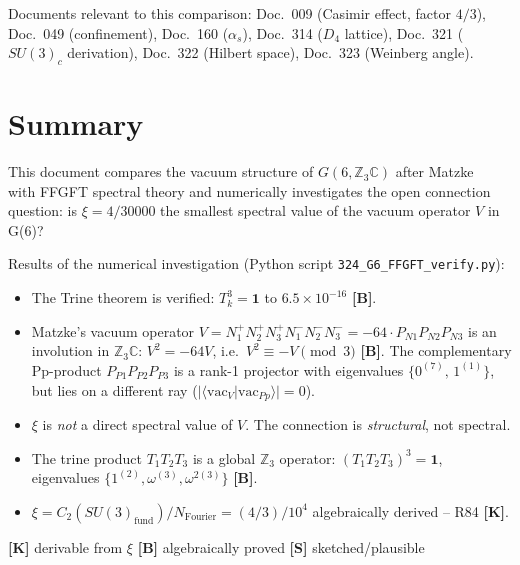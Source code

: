
Documents relevant to this comparison: Doc.~009 (Casimir effect, factor $4/3$),
Doc.~049 (confinement), Doc.~160 ($\alpha_s$), Doc.~314 ($D_4$ lattice),
Doc.~321 ($SU(3)_c$ derivation), Doc.~322 (Hilbert space),
Doc.~323 (Weinberg angle).

\section*{Summary}

This document compares the vacuum structure of $G(6,\mathbb{Z}_3\mathbb{C})$
after Matzke~\cite{matzke2026} with FFGFT spectral theory and numerically
investigates the open connection question: is $\xi = 4/30000$ the smallest
spectral value of the vacuum operator $V$ in G(6)?

Results of the numerical investigation (Python script
\texttt{324\_G6\_FFGFT\_verify.py}):

\begin{itemize}
  \item The Trine theorem is verified: $T_k^3 = \mathbf{1}$
    to $6.5\times10^{-16}$ \textbf{[B]}.
  \item Matzke's vacuum operator $V = N_1^+N_2^+N_3^+N_1^-N_2^-N_3^- = -64\cdot P_{N1}P_{N2}P_{N3}$
    is an involution in $\mathbb{Z}_3\mathbb{C}$: $V^2 = -64V$,
    i.e.\ $V^2 \equiv -V \pmod{3}$ \textbf{[B]}.
    The complementary Pp-product $P_{P1}P_{P2}P_{P3}$ is a rank-1 projector
    with eigenvalues $\{0^{(7)},\, 1^{(1)}\}$, but lies on a different ray
    ($|\langle\mathrm{vac}_V|\mathrm{vac}_{Pp}\rangle| = 0$).
  \item $\xi$ is \emph{not} a direct spectral value of $V$.
    The connection is \emph{structural}, not spectral.
  \item The trine product $T_1 T_2 T_3$ is a global $\mathbb{Z}_3$ operator:
    $(T_1 T_2 T_3)^3 = \mathbf{1}$,
    eigenvalues $\{1^{(2)}, \omega^{(3)}, \omega^{2(3)}\}$ \textbf{[B]}.
  \item $\xi = C_2(SU(3)_{\text{fund}})/N_{\text{Fourier}} = (4/3)/10^4$
    algebraically derived -- R84 \textbf{[K]}.
\end{itemize}

\begin{keyresult}
\textbf{[K]} derivable from $\xi$ \quad
\textbf{[B]} algebraically proved \quad
\textbf{[S]} sketched/plausible
\end{keyresult}


